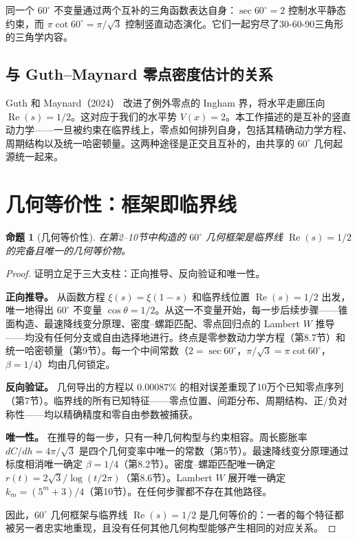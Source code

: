 \documentclass[12pt,a4paper]{article}
\newtheorem{proposition}[theorem]{命题}
\begin{document}
同一个 $60^\circ$ 不变量通过两个互补的三角函数表达自身：$\sec 60^\circ = 2$ 控制水平静态约束，而 $\pi\cot 60^\circ = \pi/\sqrt{3}$ 控制竖直动态演化。它们一起穷尽了30-60-90三角形的三角学内容。

\subsection{与 Guth--Maynard 零点密度估计的关系}

Guth 和 Maynard（2024）\cite{guth-maynard} 改进了例外零点的 Ingham 界，将水平走廊压向 $\operatorname{Re}(s)=1/2$。这对应于我们的水平势 $V(x)=2$。本工作描述的是互补的竖直动力学——一旦被约束在临界线上，零点如何排列自身，包括其精确动力学方程、周期结构以及统一哈密顿量。这两种途径是正交且互补的，由共享的 $60^\circ$ 几何起源统一起来。

\section{几何等价性：框架即临界线}

\begin{proposition}[几何等价性]
\label{prop:equivalence}
在第2--10节中构造的 $60^\circ$ 几何框架是临界线 $\operatorname{Re}(s)=1/2$ 的完备且唯一的几何等价物。
\end{proposition}

\begin{proof}
证明立足于三大支柱：正向推导、反向验证和唯一性。

\textbf{正向推导。} 从函数方程 $\xi(s)=\xi(1-s)$ 和临界线位置 $\operatorname{Re}(s)=1/2$ 出发，唯一地得出 $60^\circ$ 不变量 $\cos\theta = 1/2$。从这一不变量开始，每一步后续步骤——锥面构造、最速降线变分原理、密度--螺距匹配、零点回归点的 Lambert $W$ 推导——均没有任何分支或自由选择地进行。终点是零参数动力学方程（第8.7节）和统一哈密顿量（第9节）。每一个中间常数（$2 = \sec 60^\circ$，$\pi/\sqrt{3} = \pi\cot 60^\circ$，$\beta = 1/4$）均由几何锁定。

\textbf{反向验证。} 几何导出的方程以 $0.00087\%$ 的相对误差重现了10万个已知零点序列（第7节）。临界线的所有已知特征——零点位置、间距分布、周期结构、正/负对称性——均以精确精度和零自由参数被捕获。

\textbf{唯一性。} 在推导的每一步，只有一种几何构型与约束相容。周长膨胀率 $dC/dh = 4\pi/\sqrt{3}$ 是四个几何变率中唯一的常数（第5节）。最速降线变分原理通过标度相消唯一确定 $\beta = 1/4$（第8.2节）。密度--螺距匹配唯一确定 $r(t) = 2\sqrt{3}/\log(t/2\pi)$（第8.6节）。Lambert $W$ 展开唯一确定 $k_m = (5^m+3)/4$（第10节）。在任何步骤都不存在其他路径。

因此，$60^\circ$ 几何框架与临界线 $\operatorname{Re}(s)=1/2$ 是几何等价的：一者的每个特征都被另一者忠实地重现，且没有任何其他几何构型能够产生相同的对应关系。
\end{proof}
\end{document}
